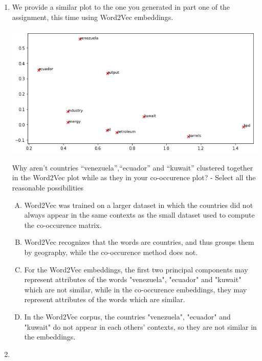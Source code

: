 \begin{enumerate}[1.]
\item {}

We provide a similar plot to the one you generated in part one of the assignment, this time using Word2Vec embeddings.

\begin{center}
\includegraphics[width=1\textwidth]{embeddings_plot.png}
\end{center}

Why aren't countries ``venezuela'',``ecuador'' and ``kuwait'' clustered together in the Word2Vec plot while as they in your co-occurence plot? - Select all the reasonable possibilities

\begin{enumerate}[A)]
\item Word2Vec was trained on a larger dataset in which the countries did not always appear in the same contexts as the small dataset used to compute the co-occurence matrix.
\item Word2Vec recognizes that the words are countries, and thus groups them by geography, while the co-occurence method does not. 
\item For the Word2Vec embeddings, the first two principal components may represent attributes of the words "venezuela", "ecuador" and "kuwait" which are not similar, while in the co-occurence embeddings, they may represent attributes of the words which are similar. 
\item In the Word2Vec corpus, the countries "venezuela", "ecuador" and "kuwait" do not appear in each others’ contexts, so they are not similar in the embeddings.
\end{enumerate}


\item {}


\end{enumerate}
